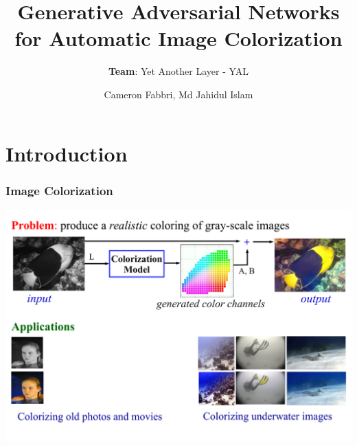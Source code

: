 \documentclass{beamer}
\title{Generative Adversarial Networks for Automatic Image Colorization}
\subtitle{\textbf{Team}: Yet Another Layer - YAL}
\author{Cameron Fabbri, Md Jahidul Islam}
\begin{document}
\date{}
\begin{frame}
\thispagestyle{empty}
\titlepage
\end{frame}

\section*{Introduction}
\begin{frame}
\frametitle{\textbf{Image Colorization}}

\includegraphics[width=\linewidth]{6.pdf}



\end{frame}
\end{document}
